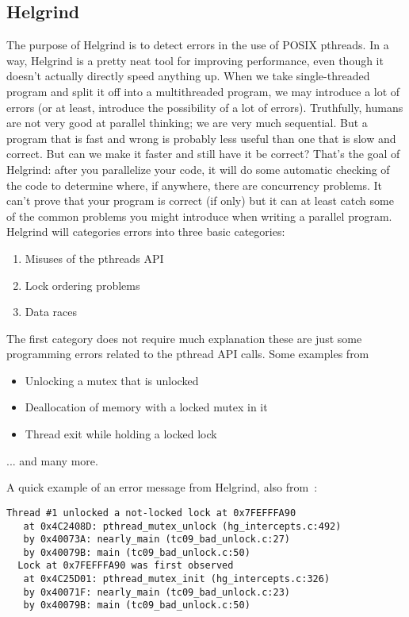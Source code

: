 \subsection*{Helgrind}  
The purpose of Helgrind is to detect errors in the use of POSIX pthreads. In a way, Helgrind is a pretty neat tool for improving performance, even though it doesn't actually directly speed anything up. When we take single-threaded program and split it off into a multithreaded program, we may introduce a lot of errors (or at least, introduce the possibility of a lot of errors). Truthfully, humans are not very good at parallel thinking; we are very much sequential. But a program that is fast and wrong is probably less useful than one that is slow and correct. But can we make it faster and still have it be correct? That's the goal of Helgrind: after you parallelize your code, it will do some automatic checking of the code to determine where, if anywhere, there are concurrency problems. It can't prove that your program is correct (if only) but it can at least catch some of the common problems you might introduce when writing a parallel program. Helgrind will categories errors into three basic categories:

\begin{enumerate}
	\item Misuses of the pthreads API
	\item Lock ordering problems
	\item Data races
\end{enumerate}

The first category does not require much explanation these are just some programming errors related to the pthread API calls. Some examples from~\cite{helgrind}

\begin{itemize}
	\item Unlocking a mutex that is unlocked
	\item Deallocation of memory with a locked mutex in it
	\item Thread exit while holding a locked lock
\end{itemize}
... and many more.

A quick example of an error message from Helgrind, also from~\cite{helgrind}:

\begin{verbatim}
Thread #1 unlocked a not-locked lock at 0x7FEFFFA90
   at 0x4C2408D: pthread_mutex_unlock (hg_intercepts.c:492)
   by 0x40073A: nearly_main (tc09_bad_unlock.c:27)
   by 0x40079B: main (tc09_bad_unlock.c:50)
  Lock at 0x7FEFFFA90 was first observed
   at 0x4C25D01: pthread_mutex_init (hg_intercepts.c:326)
   by 0x40071F: nearly_main (tc09_bad_unlock.c:23)
   by 0x40079B: main (tc09_bad_unlock.c:50)
\end{verbatim}



